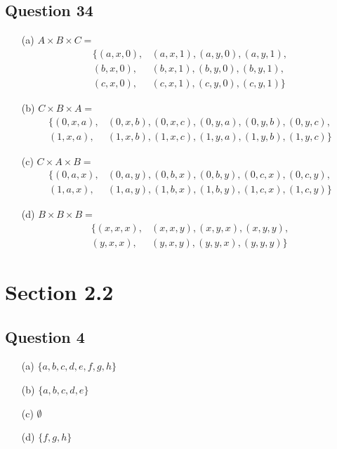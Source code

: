 \documentclass{article}
\begin{document}
\subsection*{Question 34}
\begin{itemize}
    \item[(a)] \( A \times B \times C = \)
    \[
    \begin{aligned}
    \{ (a, x, 0), & (a, x, 1), (a, y, 0), (a, y, 1), \\
    (b, x, 0), & (b, x, 1), (b, y, 0), (b, y, 1), \\
    (c, x, 0), & (c, x, 1), (c, y, 0), (c, y, 1) \}
    \end{aligned}
    \]
    
    \item[(b)] \( C \times B \times A = \)
    \[
    \begin{aligned}
    \{ (0, x, a), & (0, x, b), (0, x, c), (0, y, a), (0, y, b), (0, y, c), \\
    (1, x, a), & (1, x, b), (1, x, c), (1, y, a), (1, y, b), (1, y, c) \}
    \end{aligned}
    \]
    
    \item[(c)] \( C \times A \times B = \)
    \[
    \begin{aligned}
    \{ (0, a, x), & (0, a, y), (0, b, x), (0, b, y), (0, c, x), (0, c, y), \\
    (1, a, x), & (1, a, y), (1, b, x), (1, b, y), (1, c, x), (1, c, y) \}
    \end{aligned}
    \]
    
    \item[(d)] \( B \times B \times B = \)
    \[
    \begin{aligned}
    \{ (x, x, x), & (x, x, y), (x, y, x), (x, y, y), \\
    (y, x, x), & (y, x, y), (y, y, x), (y, y, y) \}
    \end{aligned}
    \]
\end{itemize}

\section*{Section 2.2}
\subsection*{Question 4}
\begin{itemize}
    \item[(a)] $\{a, b, c, d, e, f, g, h\}$
    \item[(b)] $\{a, b, c, d, e\}$
    \item[(c)] $\emptyset$
    \item[(d)] $\{f, g, h\}$
\end{itemize}
\end{document}
